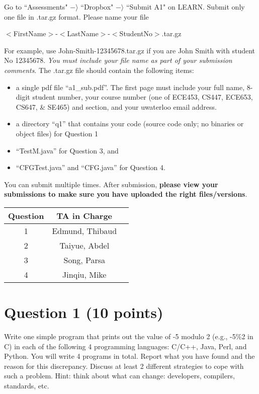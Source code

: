 \documentclass[10pt]{article}
\begin{document}
 \vspace{0.03in}
Go to ``Assessments" $-\rangle$ ``Dropbox" $-\rangle$ ``Submit A1" on LEARN. 
Submit only one file in .tar.gz format. Please name your file 

          {\small $<$FirstName$>$-$<$LastName$>$-$<$StudentNo$>$.tar.gz 

For example, use John-Smith-12345678.tar.gz if you are John Smith with student No 12345678.
{\em You must include your file name as part of your submission comments}.
The .tar.gz file should contain the following items:

 \begin{itemize}
 \item a single pdf file ``a1\_sub.pdf''. 
The first page must include your full name, 8-digit student number, your course number (one of ECE453, CS447, ECE653, CS647, \& SE465) and section, and your uwaterloo email address. 
 
\item a directory ``q1'' that contains your code (source code only; no binaries or object files) for Question 1 
\item ``TestM.java''
 for Question 3, and 
\item ``CFGTest.java'' and ``CFG.java'' for Question 4.  
\end{itemize}
 
You can submit multiple times.  After submission, {\bf please view your submissions to make sure you have uploaded the right files/versions}.
 
 
 \begin{center}
 \begin{tabular}{|c|c|c|}
 \hline
 Question   &  TA in Charge \\ \hline
1 & Edmund, Thibaud \\ \hline
2 & Taiyue, Abdel \\ \hline
3 & Song, Parsa \\ \hline
4 & Jinqiu, Mike \\ \hline
 \end{tabular}
 \end{center}

\newpage

\section*{Question 1 (10 points)}
Write one simple program that prints out the value of -5 modulo 2 (e.g., -5\%2 in C) in each of the following 4 programming languages: C/C++, Java, Perl, and Python. You will write 4 programs in total. 
Report what you have found and the reason for this discrepancy. 
Discuss at least 2 different strategies to cope with such a problem. 
Hint: think about what can change: developers, compilers, standards, etc.

}
\end{document}
